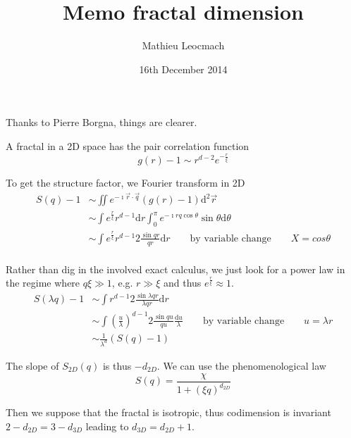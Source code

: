 \documentclass[12pt,a4paper]{article}
\author{Mathieu Leocmach}
\title{Memo fractal dimension}
\date{16th December 2014}
\begin{document}
\maketitle

Thanks to Pierre Borgna, things are clearer.

A fractal in a 2D space has the pair correlation function
\begin{equation}
g(r) -1 \sim r^{d-2} e^{-\frac{r}{\xi}}
\end{equation}

To get the structure factor, we Fourier transform in 2D
\begin{align*}
S(q) -1 &\sim \iint e^{-\imath \vec{r}\cdot\vec{q}} \left(g(r)-1\right) \mathrm{d}^2\vec{r}\\
&\sim \int e^\frac{r}{\xi} r^{d-1} \mathrm{d}r
	\int_0^\pi e^{-\imath rq \cos \theta} \sin\theta \mathrm{d}\theta\\
&\sim \int e^\frac{r}{\xi} r^{d-1} 2\frac{\sin qr}{qr}\mathrm{d}r
\qquad\text{by variable change}\qquad X=cos\theta\\
\end{align*}

Rather than dig in the involved exact calculus, we just look for a power law in the regime where $q\xi \gg 1$, e.g. $r\gg \xi$ and thus $e^\frac{r}{\xi} \approx 1$.
\begin{align*}
S(\lambda q) -1 &\sim \int r^{d-1} 2\frac{\sin \lambda qr}{\lambda qr}\mathrm{d}r\\
&\sim \int \left(\frac{u}{\lambda}\right)^{d-1} 2\frac{\sin qu}{qu}\frac{\mathrm{d}u}{\lambda} \qquad\text{by variable change}\qquad u=\lambda r\\
&\sim \frac{1}{\lambda^d} \left(S(q) -1\right)
\end{align*}

The slope of $S_{2D}(q)$ is thus $-d_{2D}$. We can use the phenomenological law
\begin{equation}
S(q) = \frac{\chi}{1+(\xi q)^{d_{2D}}}
\end{equation}

Then we suppose that the fractal is isotropic, thus codimension is invariant $2-d_{2D} = 3-d_{3D}$ leading to $d_{3D} = d_{2D}+1$.
\end{document}

